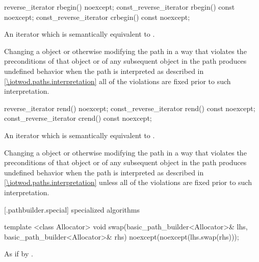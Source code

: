 %
%
\begin{itemdecl}
reverse_iterator rbegin() noexcept;
const_reverse_iterator rbegin() const noexcept;
const_reverse_iterator crbegin() const noexcept;
\end{itemdecl}
\begin{itemdescr}
\pnum
\returns
An iterator which is semantically equivalent to .

\pnum
\remarks
Changing a  object or otherwise modifying the path in a way that violates the preconditions of that  object or of any subsequent  object in the path produces undefined behavior when the path is interpreted as described in \ref{\iotwod.paths.interpretation} all of the violations are fixed prior to such interpretation.
\end{itemdescr}

%
%
\begin{itemdecl}
reverse_iterator rend() noexcept;
const_reverse_iterator rend() const noexcept;
const_reverse_iterator crend() const noexcept;
\end{itemdecl}
\begin{itemdescr}
\pnum
\returns
An iterator which is semantically equivalent to .

\pnum
\remarks
Changing a  object or otherwise modifying the path in a way that violates the preconditions of that  object or of any subsequent  object in the path produces undefined behavior when the path is interpreted as described in \ref{\iotwod.paths.interpretation} unless all of the violations are fixed prior to such interpretation.
\end{itemdescr}

[\iotwod.pathbuilder.special] { specialized algorithms}

%
\begin{itemdecl}
template <class Allocator>
void swap(basic_path_builder<Allocator>& lhs, basic_path_builder<Allocator>& rhs)
  noexcept(noexcept(lhs.swap(rhs)));
\end{itemdecl}
\begin{itemdescr}
\pnum
\effects
As if by .
\end{itemdescr}
